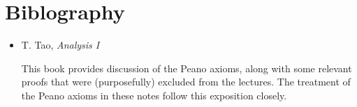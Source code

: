 \documentclass[a4paper]{scrreprt}
\begin{document}













\clearpage
\chapter*{Biblography}

\begin{itemize}
	\item T. Tao, \emph{Analysis I}
	
	This book provides discussion of the Peano axioms, along with some relevant proofs that were (purposefully) excluded from the lectures. The treatment of the Peano axioms in these notes follow this exposition closely.
\end{itemize}




\end{document}

